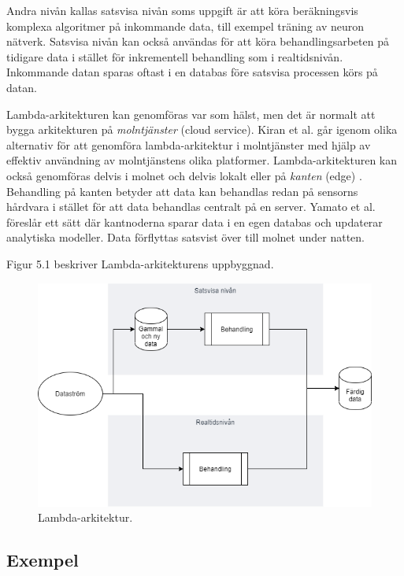Andra nivån kallas satsvisa nivån
soms uppgift är att köra beräkningsvis komplexa algoritmer på inkommande
data, till exempel träning av neuron nätverk. Satsvisa nivån kan också användas för att
köra behandlingsarbeten på tidigare data i stället för inkrementell behandling som
i realtidsnivån. Inkommande datan sparas oftast i en databas före satsvisa processen 
körs på datan.

Lambda-arkitekturen kan genomföras var som hälst, men det är normalt att bygga 
arkitekturen på \textit{molntjänster} (cloud service)\citep{kiran2015lambda}. Kiran et 
al. går igenom olika alternativ för att genomföra lambda-arkitektur i molntjänster
med hjälp av effektiv användning av molntjänstens olika platformer. Lambda-arkitekturen
kan också genomföras delvis i molnet och delvis lokalt eller på \textit{kanten} (edge) \citep{yamato2016proposal}.
Behandling på kanten betyder att data kan behandlas redan på sensorns hårdvara i stället
för att data behandlas centralt på en server. Yamato et al. föreslår ett sätt där
kantnoderna sparar data i en egen databas och updaterar analytiska modeller. Data
förflyttas satsvist över till molnet under natten.

Figur 5.1 beskriver Lambda-arkitekturens uppbyggnad.

\begin{figure}[h]
    \centering
    \includegraphics[scale=0.7]{img/lambda-arch.png}
    \caption{Lambda-arkitektur.}
    \label{fig:mesh1}
\end{figure}

\subsection{Exempel}

